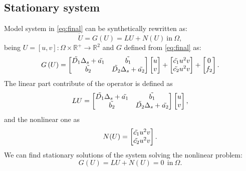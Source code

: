 \subsection{Stationary system} \label{sec:statSys}
Model system in \eqref{eq:final} can be synthetically rewritten as:
\begin{equation}\label{eq:ModelSynt}
    \dot{U} = G\left(U\right) = L U + N\left(U\right) \  \text{in} \ \Omega,
\end{equation}
being $ U = [u, v] : \Omega \times \mathds{R}^+ \longrightarrow \mathds{R}^2 $ and $G$ defined from \eqref{eq:final} as:
\begin{equation}\label{eq:G}
    G\left(U\right) = \begin{bmatrix}
    \Tilde{D_1} \Delta_s + \Tilde{a_1} & \Tilde{b_1} \\ \Tilde{b_2} & \Tilde{D_2} \Delta_s + \Tilde{a_2} \end{bmatrix} \begin{bmatrix} u \\ v \end{bmatrix} + \begin{bmatrix} \Tilde{c_1} u^2 v \\ \Tilde{c_2} u^2 v \end{bmatrix}  + \begin{bmatrix}0 \\ f_2 \end{bmatrix}.
\end{equation}
The linear part contribute of the operator is defined as
\begin{equation}
 LU = \begin{bmatrix}
 \Tilde{D_1} \Delta_s + \Tilde{a_1} & \Tilde{b_1} \\ \Tilde{b_2} & \Tilde{D_2} \Delta_s + \Tilde{a_2} \end{bmatrix} \begin{bmatrix} u \\ v \end{bmatrix},
\end{equation}
and the nonlinear one as
\begin{equation}
  N(U) = \begin{bmatrix} \Tilde{c_1} u^2 v \\ \Tilde{c_2} u^2 v \end{bmatrix} .
\end{equation}
We can find stationary solutions of the system solving the nonlinear problem:
\begin{equation}
 G\left(U\right) = L U + N\left(U\right) = 0 \ \ \text{in} \ \Omega.
\end{equation}

